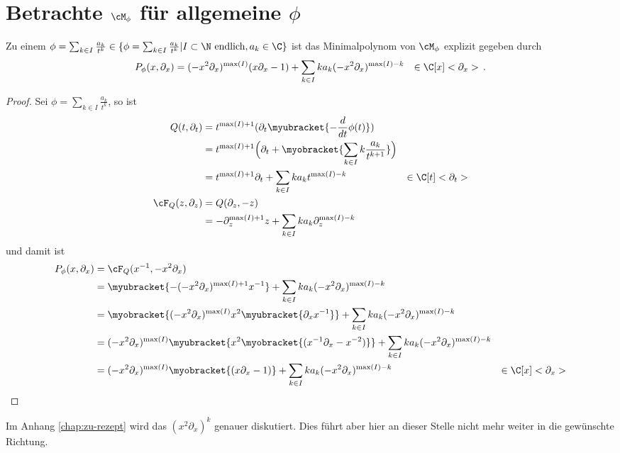 \section{Betrachte $\cM_\phi$ für allgemeine $\phi$}
\label{sec:allgemeinProblem}
\begin{lem}
Zu einem $\phi=\sum_{k\in I}\frac{a_k}{t^{k}}\in \{\phi=\sum_{k\in
I}\frac{a_k}{t^{k}}|I\subset\N\mbox{ endlich} ,a_k\in \C\}$ ist das
Minimalpolynom von $\cM_\phi$ explizit gegeben durch
\begin{align*}
P_{\phi}(x,\partial_x) &=(-x^2\partial_x)^{\max(I)} (x\partial_x-1)
   +\sum_{k\in I}k a_k(-x^2\partial_x)^{\max(I)-k} & \in \C[x]<\partial_x> \,.
\end{align*}
\end{lem}
\begin{proof}
Sei $\phi=\sum_{k\in I}\frac{a_k}{t^{k}}$, so ist
\begin{align*}
Q(t,\partial_t) &= t^{\max(I)+1}(\partial_t\myubracket{-\frac{d}{dt}\phi(t)})
\\&=t^{\max(I)+1}\Big(
    \partial_t+\myobracket{\sum_{k\in I} k\frac{a_k}{t^{k+1}}}\Big)
\\&=t^{\max(I)+1}\partial_t +\sum_{k\in I}k a_k t^{\max(I)-k}
  & \in \C[t]<\partial_t>
\\\cF_Q(z,\partial_z) &=Q(\partial_z,-z)
\\&=-\partial_z^{\max(I)+1}z +\sum_{k\in I}k a_k\partial_z^{\max(I)-k}
\end{align*}
und damit ist
\begin{align*}
P_{\phi}(x,\partial_x) &=\cF_Q(x^{-1},-x^2\partial_x)
\\&=\myubracket{-(-x^2\partial_x)^{\max(I)+1}x^{-1}}
  +\sum_{k\in I}k a_k(-x^2\partial_x)^{\max(I)-k}
\\&=\myobracket{(-x^2\partial_x)^{\max(I)} x^2\myubracket{\partial_xx^{-1}}}
   +\sum_{k\in I}k a_k(-x^2\partial_x)^{\max(I)-k}
\\&=(-x^2\partial_x)^{\max(I)}
   \myubracket{ x^2 \myobracket{(x^{-1}\partial_x-x^{-2})} }
   +\sum_{k\in I}k a_k(-x^2\partial_x)^{\max(I)-k}
\\&=(-x^2\partial_x)^{\max(I)} \myobracket{(x\partial_x-1)}
   +\sum_{k\in I}k a_k(-x^2\partial_x)^{\max(I)-k}
  & \in \C[x]<\partial_x>
\end{align*}
\end{proof}
Im Anhang \ref{chap:zu-rezept} wird das $(x^2\partial_x)^{k}$ genauer
diskutiert. Dies führt aber hier an dieser Stelle nicht mehr weiter in die
gewünschte Richtung.

